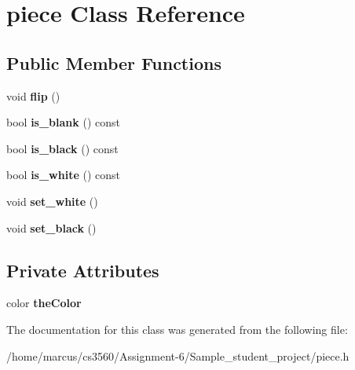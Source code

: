 \hypertarget{classpiece}{}\section{piece Class Reference}
\label{classpiece}
\subsection*{Public Member Functions}
\begin{DoxyCompactItemize}
\item 
void {\bfseries flip} ()\hypertarget{classpiece_ab898c5827a5859e4cddc9d61a814a873}{}\label{classpiece_ab898c5827a5859e4cddc9d61a814a873}

\item 
bool {\bfseries is\+\_\+blank} () const \hypertarget{classpiece_af8e5afd9e1eb6b367c7da643c94c7113}{}\label{classpiece_af8e5afd9e1eb6b367c7da643c94c7113}

\item 
bool {\bfseries is\+\_\+black} () const \hypertarget{classpiece_abb229bd7452561f1f3aa794e5561aa60}{}\label{classpiece_abb229bd7452561f1f3aa794e5561aa60}

\item 
bool {\bfseries is\+\_\+white} () const \hypertarget{classpiece_a229a0c4b29e449350b2c3ba019e6c9a9}{}\label{classpiece_a229a0c4b29e449350b2c3ba019e6c9a9}

\item 
void {\bfseries set\+\_\+white} ()\hypertarget{classpiece_a31480899f2a591fdb22d97933303e19d}{}\label{classpiece_a31480899f2a591fdb22d97933303e19d}

\item 
void {\bfseries set\+\_\+black} ()\hypertarget{classpiece_a273d63d07b6ea973b2fc4f7e1b56ea10}{}\label{classpiece_a273d63d07b6ea973b2fc4f7e1b56ea10}

\end{DoxyCompactItemize}
\subsection*{Private Attributes}
\begin{DoxyCompactItemize}
\item 
color {\bfseries the\+Color}\hypertarget{classpiece_a708f7114877b8c4864e2b8e605794f4f}{}\label{classpiece_a708f7114877b8c4864e2b8e605794f4f}

\end{DoxyCompactItemize}


The documentation for this class was generated from the following file\+:\begin{DoxyCompactItemize}
\item 
/home/marcus/cs3560/\+Assignment-\/6/\+Sample\+\_\+student\+\_\+project/piece.\+h\end{DoxyCompactItemize}
